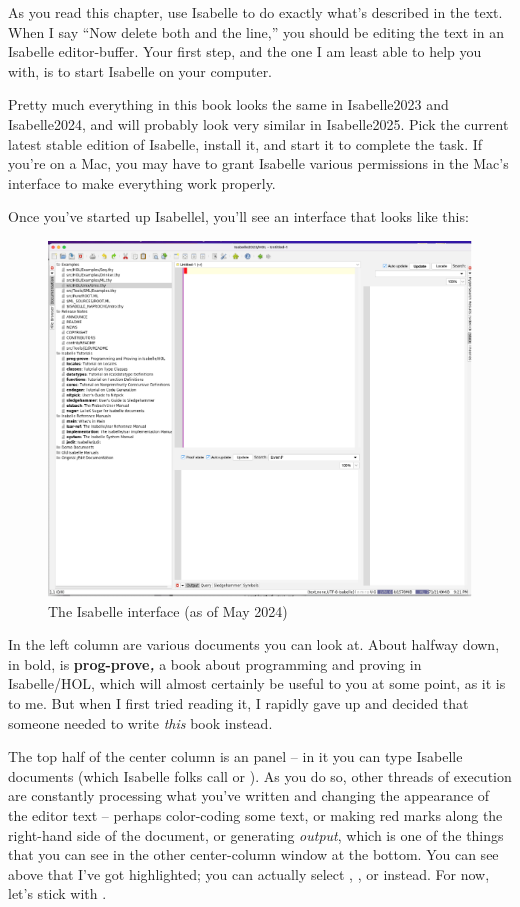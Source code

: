 \task
As you read this chapter, use Isabelle to do exactly what's described in the text. When I say ``Now delete both  and the  line,'' you should be editing the text in an Isabelle editor-buffer. Your first step, and the one I am least able to help you with, is to start Isabelle on your computer. 
\etask

Pretty much everything in this book looks the same in Isabelle2023 and Isabelle2024, and will probably look very similar in Isabelle2025. Pick the current latest stable edition of Isabelle, install it, and start it to complete the task. If you're on a Mac, you may have to grant Isabelle various permissions in the Mac's interface to make everything work properly. 

Once you've started up Isabellel, you'll see an interface that looks like this:
\begin{figure}[h]
    \centering
    \includegraphics[width=0.7\linewidth]{TEXT//C01//Images/interface.png}
    \caption{The Isabelle interface (as of May 2024)}
    \label{fig:C1-interface}
\end{figure}
In the left column are various documents you can look at. About halfway down, in bold, is \textbf{prog-prove}\textit{\textbf{,}} a book about programming and proving in Isabelle/HOL, which will almost certainly be useful to you at some point, as it is to me. But when I first tried reading it, I rapidly gave up and decided that someone needed to write \textit{this} book instead. 

The top half of the center column is an  panel -- in it you can type Isabelle documents (which Isabelle folks call  or ). As you do so, other threads of execution are constantly processing what you've written and changing the appearance of the editor text -- perhaps color-coding some text, or making red marks along the right-hand side of the document, or generating \textit{output}, which is one of the things that you can see in the other center-column window at the bottom. You can see above that I've got  highlighted; you can actually select , , or  instead. For now, let's stick with . 

